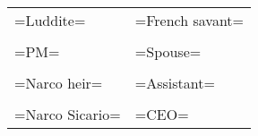 \documentclass{article}
\begin{document}
\thispagestyle{empty}


\Huge
\bgroup
\def\arraystretch{2}%
\begin{tabular}{|p{ 0.45\hsize }|p{0.45\hsize}|}
\hline
                   &                     \\ \hline
   =Luddite=       &  =French savant=    \\ \hline
                   &                     \\ \hline
   =PM=            &  =Spouse=           \\ \hline
                   &                     \\ \hline
   =Narco heir=    &  =Assistant=        \\ \hline
                   &                     \\ \hline
   =Narco Sicario= &   =CEO=             \\ \hline
\end{tabular}
\egroup
\end{document}
